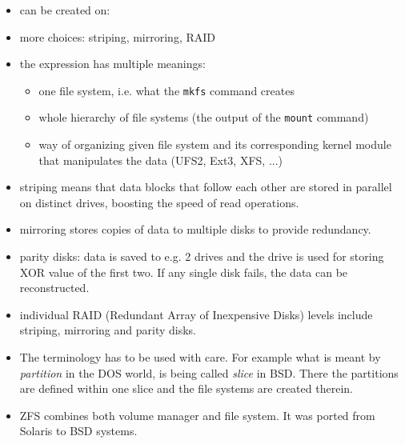 
\begin{slide}
\begin{itemize}
\item {} can be created on:
\item more choices: striping, mirroring, RAID
\end{itemize}
\begin{center}

\end{center}
\end{slide}

\begin{itemize}
\item the expression  has multiple meanings:
    \begin{itemize}
    \item one file system, i.e. what the \texttt{mkfs} command creates
    \item whole hierarchy of file systems (the output of the
    \texttt{mount} command)
    \item way of organizing given file system and its corresponding kernel
    module that manipulates the data (UFS2, Ext3, XFS, ...)
    \end{itemize}
\item striping means that data blocks that follow each other are stored in
parallel on distinct drives, boosting the speed of read operations.
\item mirroring stores copies of data to multiple disks to provide redundancy.
\item parity disks: data is saved to e.g. 2 drives and the  drive is used
for storing XOR value of the first two. If any single disk fails, the data can
be reconstructed.
\item individual RAID (Redundant Array of Inexpensive Disks) levels include
striping, mirroring and parity disks.
\item The terminology has to be used with care. For example what is meant by
\emph{partition} in the DOS world, is being called \emph{slice} in BSD.
There the partitions are defined within one slice and the file systems are
created therein.
\item ZFS combines both volume manager and file system. It was ported from
Solaris to BSD systems.
\end{itemize}

